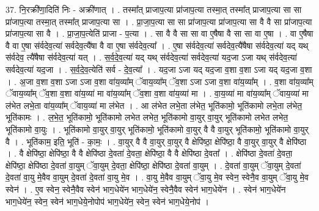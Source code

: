 \documentclass[17pt]{extarticle}
\begin{document}
37. नि॒रक्री॑णा॒दिति॑ निः - अक्री॑णात् । . तस्मा᳚त् प्राजाप॒त्या प्रा॑जाप॒त्या तस्मा॒त् तस्मा᳚त् प्राजाप॒त्या सा सा प्रा॑जाप॒त्या तस्मा॒त् तस्मा᳚त् प्राजाप॒त्या सा । . प्रा॒जा॒प॒त्या सा सा प्रा॑जाप॒त्या प्रा॑जाप॒त्या सा वै वै सा प्रा॑जाप॒त्या प्रा॑जाप॒त्या सा वै । . प्रा॒जा॒प॒त्येति॑ प्राजा - प॒त्या । . सा वै वै सा सा वा ए॒षैषा वै सा सा वा ए॒षा । . वा ए॒षैषा वै वा ए॒षा स॑र्वदेव॒त्या॑ सर्वदेव॒त्यै॑षा वै वा ए॒षा स॑र्वदेव॒त्या᳚ । . ए॒षा स॑र्वदेव॒त्या॑ सर्वदेव॒त्यै॑षैषा स॑र्वदेव॒त्या॑ यद् यथ् स॑र्वदेव॒ त्यै॑षैषा स॑र्वदेव॒त्या॑ यत् । . स॒र्व॒दे॒व॒त्या॑ यद् यथ् स॑र्वदेव॒त्या॑ सर्वदेव॒त्या॑ यद॒जा ऽजा यथ् स॑र्वदेव॒त्या॑ सर्वदेव॒त्या॑ यद॒जा । . स॒र्व॒दे॒व॒त्येति॑ सर्व - दे॒व॒त्या᳚ । . यद॒जा ऽजा यद् यद॒जा व॒शा व॒शा ऽजा यद् यद॒जा व॒शा । . अ॒जा व॒शा व॒शा ऽजा ऽजा व॒शा वा॑य॒व्या᳚म् ॅवाय॒व्या᳚म् ॅव॒शा ऽजा ऽजा व॒शा वा॑य॒व्या᳚म् । . व॒शा वा॑य॒व्या᳚म् ॅवाय॒व्या᳚म् ॅव॒शा व॒शा वा॑य॒व्या॑ मा वा॑य॒व्या᳚म् ॅव॒शा व॒शा वा॑य॒व्या॑ मा । . वा॒य॒व्या॑ मा वा॑य॒व्या᳚म् ॅवाय॒व्या॑ मा ल॑भेत लभे॒ता वा॑य॒व्या᳚म् ॅवाय॒व्या॑ मा ल॑भेत । . आ ल॑भेत लभे॒ता ल॑भेत॒ भूति॑कामो॒ भूति॑कामो लभे॒ता ल॑भेत॒ भूति॑कामः । . ल॒भे॒त॒ भूति॑कामो॒ भूति॑कामो लभेत लभेत॒ भूति॑कामो वा॒युर् वा॒युर् भूति॑कामो लभेत लभेत॒ भूति॑कामो वा॒युः । . भूति॑कामो वा॒युर् वा॒युर् भूति॑कामो॒ भूति॑कामो वा॒युर् वै वै वा॒युर् भूति॑कामो॒ भूति॑कामो वा॒युर् वै । . भूति॑काम॒ इति॒ भूति॑ - का॒मः॒ । . वा॒युर् वै वै वा॒युर् वा॒युर् वै क्षेपि॑ष्ठा॒ क्षेपि॑ष्ठा॒ वै वा॒युर् वा॒युर् वै क्षेपि॑ष्ठा । . वै क्षेपि॑ष्ठा॒ क्षेपि॑ष्ठा॒ वै वै क्षेपि॑ष्ठा दे॒वता॑ दे॒वता॒ क्षेपि॑ष्ठा॒ वै वै क्षेपि॑ष्ठा दे॒वता᳚ । . क्षेपि॑ष्ठा दे॒वता॑ दे॒वता॒ क्षेपि॑ष्ठा॒ क्षेपि॑ष्ठा दे॒वता॑ वा॒युम् ॅवा॒युम् दे॒वता॒ क्षेपि॑ष्ठा॒ क्षेपि॑ष्ठा दे॒वता॑ वा॒युम् । . दे॒वता॑ वा॒युम् ॅवा॒युम् दे॒वता॑ दे॒वता॑ वा॒यु मे॒वैव वा॒युम् दे॒वता॑ दे॒वता॑ वा॒यु मे॒व । . वा॒यु मे॒वैव वा॒युम् ॅवा॒यु मे॒व स्वेन॒ स्वेनै॒व वा॒युम् ॅवा॒यु मे॒व स्वेन॑ । . ए॒व स्वेन॒ स्वेनै॒वैव स्वेन॑ भाग॒धेये॑न भाग॒धेये॑न॒ स्वेनै॒वैव स्वेन॑ भाग॒धेये॑न । . स्वेन॑ भाग॒धेये॑न भाग॒धेये॑न॒ स्वेन॒ स्वेन॑ भाग॒धेये॒नोपोप॑ भाग॒धेये॑न॒ स्वेन॒ स्वेन॑ भाग॒धेये॒नोप॑ । \newline
\pagebreak
{}
\end{document}

